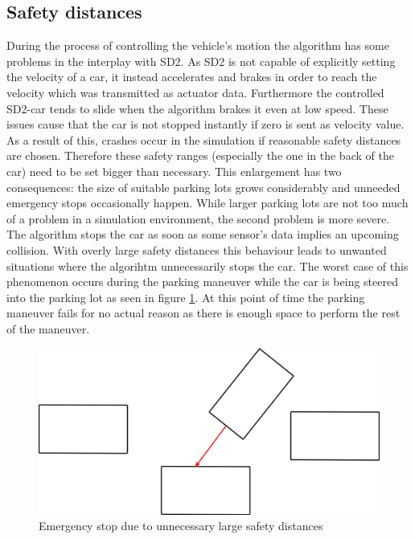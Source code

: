 \documentclass[paper=a4, fontsize=11pt]{scrreprt}
\begin{document}
\subsection{Safety distances} \label{distances}
During the process of controlling the vehicle's motion the algorithm has some problems in the interplay with SD2. As SD2 is not capable of explicitly setting the velocity of a car, it instead accelerates and brakes in order to reach the velocity which was transmitted as actuator data. Furthermore the controlled SD2-car tends to slide when the algorithm brakes it even at low speed. These issues cause that the car is not stopped instantly if zero is sent as velocity value. As a result of this, crashes occur in the simulation if reasonable safety distances are chosen. Therefore these safety ranges (especially the one in the back of the car) need to be set bigger than necessary. This enlargement has two consequences: the size of suitable parking lots grows considerably and unneeded emergency stops occasionally happen. While larger parking lots are not too much of a problem in a simulation environment, the second problem is more severe. The algorithm stops the car as soon as some sensor's data implies an upcoming collision. With overly large safety distances this behaviour leads to unwanted situations where the algorihtm unnecessarily stops the car. The worst case of this phenomenon occurs during the parking maneuver while the car is being steered into the parking lot as seen in figure \ref{false_emergency}. At this point of time the parking maneuver fails for no actual reason as there is enough space to perform the rest of the maneuver.
\begin{figure}[H]
\centering
\includegraphics[scale=0.35]{images_ecu/emergency_stop.png}
\caption{\tiny Emergency stop due to unnecessary large safety distances}
\label{false_emergency}
\end{figure}
\end{document}

